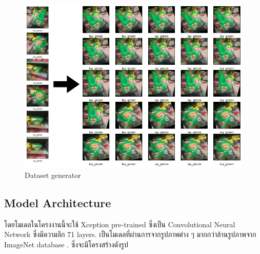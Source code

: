 \begin{figure}[h]
  \begin{center}
   
  \includegraphics[scale=0.4]{pic/model/lay_genmore.png}
  \end{center}
  
  \caption[Dataset generator]{Dataset generator}
  \label{fig:Dataset generator}
  \end{figure}




\newpage
\subsection{Model Architecture}
โดยโมเดลในโครงงานนี้จะใช้ Xception pre-trained ซึ่งเป็น Convolutional Neural Network ซึ่งมีความลึก 71 layers.
เป็นโมเดลที่ผ่านการจากรูปภาพต่าง ๆ มากกว่าล้านรูปภาพจาก ImageNet database .
ซึ่งจะมีโครงสร้างดังรูป


